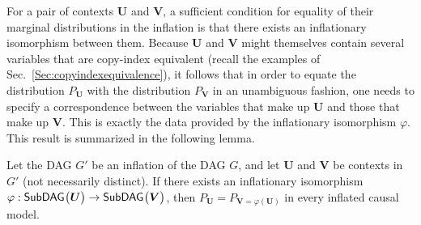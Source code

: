 

For a pair of contexts $\bm{U}$ and $\bm{V}$, a sufficient condition for equality of their marginal distributions in the inflation is that there exists an inflationary isomorphism between them.  Because $\bm{U}$ and $\bm{V}$ might themselves contain several variables that are copy-index equivalent (recall the examples of Sec.~\ref{Sec:copyindexequivalence}), it follows that in order to equate the distribution $P_{\bm{U}}$ with the distribution $P_{\bm{V}}$ in an unambiguous fashion, one needs to specify a correspondence between the variables that make up $\bm{U}$ and those that make up $\bm{V}$. This is exactly the data provided by the inflationary isomorphism $\varphi$.  This result is summarized in the following lemma.



\begin{lemma}
Let the DAG $G'$ be an inflation of the DAG $G$, and let $\bm{U}$ and $\bm{V}$ be contexts in $G'$ (not necessarily distinct). If there exists an inflationary isomorphism $\varphi:{\operatorname{\mathsf{SubDAG}}_{}}\bigl\lparen\bm{U}\bigr\rparen\to{\operatorname{\mathsf{SubDAG}}_{}}\bigl\lparen\bm{V}\bigr\rparen$, then $P_{\bm{U}} = P_{\bm{V}=\varphi (\bm{U})}$ in every inflated causal model.
	\label{lem:coincide}
\end{lemma}

